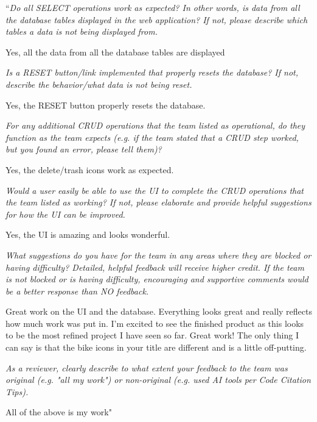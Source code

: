 \documentclass{article}
\begin{document}
\begin{tcolorbox}[colback=secondarycolor, colframe=primarycolor, title=\textbf{Step 4: Peer Review 3 - Ethan Van Hao}]
``\textit{Do all SELECT operations work as expected? In other words, is data from all the database tables displayed in the web application? If not, please describe which tables a data is not being displayed from.}

\vspace{0.05cm}
Yes, all the data from all the database tables are displayed

\vspace{0.2cm}
\textit{Is a RESET button/link implemented that properly resets the database? If not, describe the behavior/what data is not being reset.}

\vspace{0.05cm}
Yes, the RESET button properly resets the database.

\vspace{0.2cm}
\textit{For any additional CRUD operations that the team listed as operational, do they function as the team expects (e.g. if the team stated that a CRUD step worked, but you found an error, please tell them)?}

\vspace{0.05cm}
Yes, the delete/trash icons work as expected.

\vspace{0.2cm}
\textit{Would a user easily be able to use the UI to complete the CRUD operations that the team listed as working? If not, please elaborate and provide helpful suggestions for how the UI can be improved.}

\vspace{0.05cm}
Yes, the UI is amazing and looks wonderful.

\vspace{0.2cm}
\textit{What suggestions do you have for the team in any areas where they are blocked or having difficulty? Detailed, helpful feedback will receive higher credit. If the team is not blocked or is having difficulty, encouraging and supportive comments would be a better response than NO feedback.}

\vspace{0.05cm}
Great work on the UI and the database. Everything looks great and really reflects how much work was put in. I’m excited to see the finished product as this looks to be the most refined project I have seen so far. Great work! The only thing I can say is that the bike icons in your title are different and is a little off-putting.  

\vspace{0.2cm}
\textit{As a reviewer, clearly describe to what extent your feedback to the team was original (e.g. "all my work") or non-original (e.g. used AI tools per Code Citation Tips). }

\vspace{0.05cm}
All of the above is my work"

\end{tcolorbox}
\end{document}
